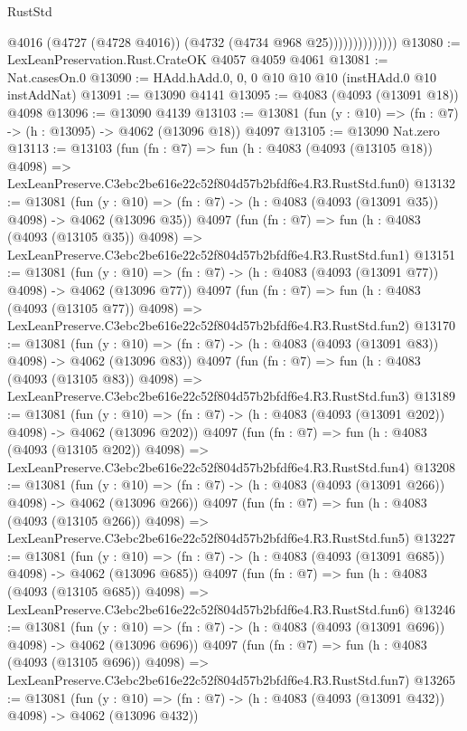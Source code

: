 \begin{lexlean}{RustStd}
\begin{coremodule}
                            @4016
                            (@4727 (@4728 @4016))
                            (@4732 (@4734 @968 @25))))))))))))))
@13080 := LexLeanPreservation.Rust.CrateOK @4057 @4059 @4061
@13081 := Nat.casesOn.{0}
@13090 := HAdd.hAdd.{0, 0, 0} @10 @10 @10 (instHAdd.{0} @10 instAddNat)
@13091 := @13090 @4141
@13095 := @4083 (@4093 (@13091 @18)) @4098
@13096 := @13090 @4139
@13103 := @13081 (fun (y : @10) => (fn : @7) -> (h : @13095) -> @4062 (@13096 @18)) @4097
@13105 := @13090 Nat.zero
@13113 := @13103
    (fun (fn : @7) =>
    fun (h : @4083 (@4093 (@13105 @18)) @4098) =>
    LexLeanPreserve.C3ebc2be616e22c52f804d57b2bfdf6e4.R3.RustStd.fun0)
@13132 := @13081
    (fun (y : @10) => (fn : @7) -> (h : @4083 (@4093 (@13091 @35)) @4098) -> @4062 (@13096 @35))
    @4097
    (fun (fn : @7) =>
    fun (h : @4083 (@4093 (@13105 @35)) @4098) =>
    LexLeanPreserve.C3ebc2be616e22c52f804d57b2bfdf6e4.R3.RustStd.fun1)
@13151 := @13081
    (fun (y : @10) => (fn : @7) -> (h : @4083 (@4093 (@13091 @77)) @4098) -> @4062 (@13096 @77))
    @4097
    (fun (fn : @7) =>
    fun (h : @4083 (@4093 (@13105 @77)) @4098) =>
    LexLeanPreserve.C3ebc2be616e22c52f804d57b2bfdf6e4.R3.RustStd.fun2)
@13170 := @13081
    (fun (y : @10) => (fn : @7) -> (h : @4083 (@4093 (@13091 @83)) @4098) -> @4062 (@13096 @83))
    @4097
    (fun (fn : @7) =>
    fun (h : @4083 (@4093 (@13105 @83)) @4098) =>
    LexLeanPreserve.C3ebc2be616e22c52f804d57b2bfdf6e4.R3.RustStd.fun3)
@13189 := @13081
    (fun (y : @10) => (fn : @7) -> (h : @4083 (@4093 (@13091 @202)) @4098) -> @4062 (@13096 @202))
    @4097
    (fun (fn : @7) =>
    fun (h : @4083 (@4093 (@13105 @202)) @4098) =>
    LexLeanPreserve.C3ebc2be616e22c52f804d57b2bfdf6e4.R3.RustStd.fun4)
@13208 := @13081
    (fun (y : @10) => (fn : @7) -> (h : @4083 (@4093 (@13091 @266)) @4098) -> @4062 (@13096 @266))
    @4097
    (fun (fn : @7) =>
    fun (h : @4083 (@4093 (@13105 @266)) @4098) =>
    LexLeanPreserve.C3ebc2be616e22c52f804d57b2bfdf6e4.R3.RustStd.fun5)
@13227 := @13081
    (fun (y : @10) => (fn : @7) -> (h : @4083 (@4093 (@13091 @685)) @4098) -> @4062 (@13096 @685))
    @4097
    (fun (fn : @7) =>
    fun (h : @4083 (@4093 (@13105 @685)) @4098) =>
    LexLeanPreserve.C3ebc2be616e22c52f804d57b2bfdf6e4.R3.RustStd.fun6)
@13246 := @13081
    (fun (y : @10) => (fn : @7) -> (h : @4083 (@4093 (@13091 @696)) @4098) -> @4062 (@13096 @696))
    @4097
    (fun (fn : @7) =>
    fun (h : @4083 (@4093 (@13105 @696)) @4098) =>
    LexLeanPreserve.C3ebc2be616e22c52f804d57b2bfdf6e4.R3.RustStd.fun7)
@13265 := @13081
    (fun (y : @10) => (fn : @7) -> (h : @4083 (@4093 (@13091 @432)) @4098) -> @4062 (@13096 @432))

\end{coremodule}
\end{lexlean}
